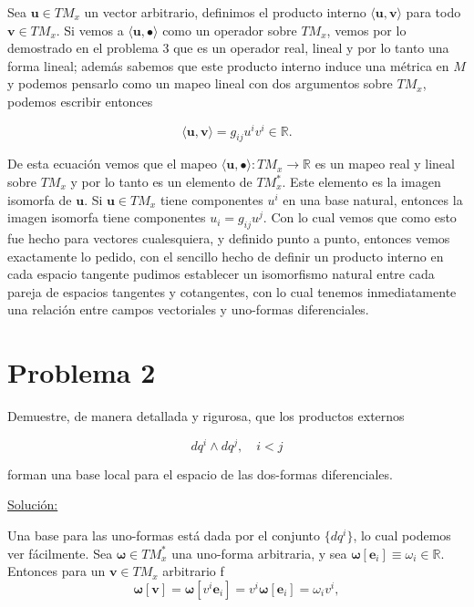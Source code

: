 \documentclass[a4paper,10pt]{article}
\numberwithin{equation}{section}
\begin{document}
\vspace{.3cm}

Sea $\mathbf{u} \in TM_x$ un vector arbitrario, definimos el producto interno 
$\langle \mathbf{u} , \mathbf{v} \rangle$ para todo $\mathbf{v} \in TM_x$. Si vemos 
a $\langle \mathbf{u} , \bullet \rangle$ como un operador sobre $TM_x$, vemos 
por lo demostrado en el problema 3 que es un operador real, lineal y por 
lo tanto una forma lineal; además sabemos que este producto interno induce 
una métrica en $M$ y podemos pensarlo como un mapeo lineal con dos argumentos 
sobre $TM_x$, podemos escribir entonces 

\begin{equation}
 \langle \mathbf{u} , \mathbf{v} \rangle = g_{ij}u^iv^i \in \mathbb{R}.
\end{equation}

De esta ecuación vemos que el mapeo $\langle \mathbf{u} , \bullet \rangle: TM_x 
\rightarrow \mathbb{R}$ es un mapeo real y lineal sobre $TM_x$ y por lo tanto 
es un elemento de $TM_x^*$. Este elemento es la imagen isomorfa de $\mathbf{u}$. 
Si $\mathbf{u} \in TM_x$ tiene componentes $u^i$ en una base natural, entonces 
la imagen isomorfa tiene componentes $u_i = g_{ij}u^j$. Con lo cual vemos que 
como esto fue hecho para vectores cualesquiera, y definido punto a punto, entonces 
vemos exactamente lo pedido, con el sencillo hecho de definir un producto interno 
en cada espacio tangente pudimos establecer un isomorfismo natural entre 
cada pareja de espacios tangentes y cotangentes, con lo cual tenemos inmediatamente 
una relación entre campos vectoriales y uno-formas diferenciales.


\section{Problema 2}

Demuestre, de manera detallada y rigurosa, que los productos externos 

$$
dq^i \wedge dq^j, \quad i < j
$$

forman una base local para el espacio de las dos-formas diferenciales.

\vspace{.3cm}

\underline{Solución:} \vspace{.3cm}

Una base para las uno-formas está dada por el conjunto $\{dq^i\}$, lo cual podemos 
ver fácilmente. Sea $\mathbf{\omega} \in TM_x^*$ una uno-forma arbitraria, y sea 
$\mathbf{\omega}[\mathbf{e}_i] \equiv \omega_i \in \mathbb{R}$. Entonces para un $\mathbf{v} \in 
TM_x$ arbitrario 
f
\begin{equation}
 \mathbf{\omega}[\mathbf{v}] = \mathbf{\omega}[v^i\mathbf{e}_i] =
 v^i\mathbf{\omega}[\mathbf{e}_i] = \omega_iv^i,
\end{equation}
\end{document}
